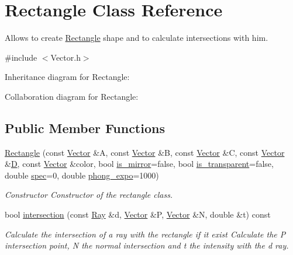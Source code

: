 \hypertarget{classRectangle}{}\section{Rectangle Class Reference}
\label{classRectangle}


Allows to create \hyperlink{classRectangle}{Rectangle} shape and to calculate intersections with him.  




{\ttfamily \#include $<$Vector.\+h$>$}



Inheritance diagram for Rectangle\+:


Collaboration diagram for Rectangle\+:
\subsection*{Public Member Functions}
\begin{DoxyCompactItemize}
\item 
\hyperlink{classRectangle_a8542be11e2dbec207af3f34f693b754c}{Rectangle} (const \hyperlink{classVector}{Vector} \&A, const \hyperlink{classVector}{Vector} \&B, const \hyperlink{classVector}{Vector} \&C, const \hyperlink{classVector}{Vector} \&\hyperlink{classRectangle_aef4ddf913d9986dd8f9c8ead043dacc1}{D}, const \hyperlink{classVector}{Vector} \&color, bool \hyperlink{classShape_a0ead7657fa5e4c7862fe1cedd670a9e5}{is\+\_\+mirror}=false, bool \hyperlink{classShape_ab8da3fc4606e66dea941ec23d25f53ef}{is\+\_\+transparent}=false, double \hyperlink{classShape_a60ef96ac5dea3478fdd1ab320e4c3bef}{spec}=0, double \hyperlink{classShape_a2556fca106f9503e6dfb4da703c28f7f}{phong\+\_\+expo}=1000)
\begin{DoxyCompactList}\small\item\em Constructor Constructor of the rectangle class. \end{DoxyCompactList}\item 
bool \hyperlink{classRectangle_a423b89ddb4be31c3ff22a86dcf076b08}{intersection} (const \hyperlink{classRay}{Ray} \&d, \hyperlink{classVector}{Vector} \&P, \hyperlink{classVector}{Vector} \&N, double \&t) const
\begin{DoxyCompactList}\small\item\em Calculate the intersection of a ray with the rectangle if it exist Calculate the P intersection point, N the normal intersection and t the intensity with the d ray. \end{DoxyCompactList}\end{DoxyCompactItemize}
